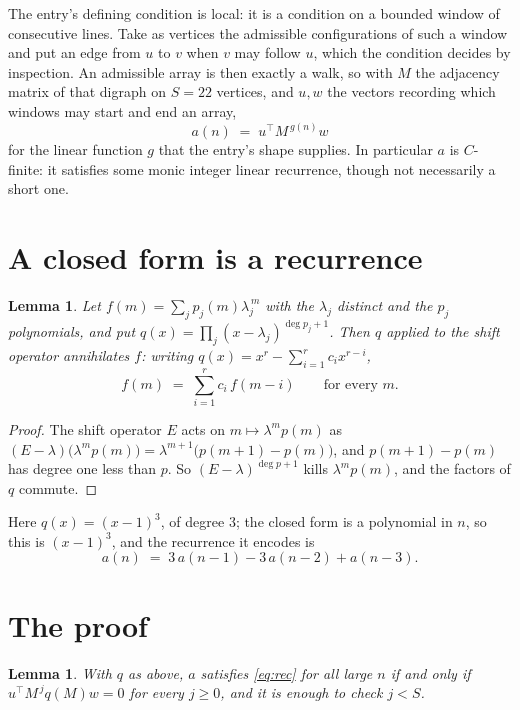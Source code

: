 \documentclass[11pt,a4paper]{article}
\theoremstyle{plain}
\newtheorem{lemma}[theorem]{Lemma}
\theoremstyle{definition}
\begin{document}
The entry's defining condition is local: it is a condition on a bounded window of consecutive lines. Take as vertices the
admissible configurations of such a window and put an edge from $u$ to $v$ when $v$ may
follow $u$, which the condition decides by inspection. An admissible array is then exactly a
walk, so with $M$ the adjacency matrix of that digraph on $S=22$ vertices, and $u,w$ the
vectors recording which windows may start and end an array,
\[
a(n)\;=\;u^{\!\top}M^{\,g(n)}w
\]
for the linear function $g$ that the entry's shape supplies. In particular $a$ is
$C$-finite: it satisfies some monic integer linear recurrence, though not necessarily a short
one.

\section{A closed form is a recurrence}

\begin{lemma}\label{lem:ann}
Let $f(m)=\sum_{j}p_j(m)\lambda_j^{\,m}$ with the $\lambda_j$ distinct and the $p_j$
polynomials, and put $q(x)=\prod_j(x-\lambda_j)^{\deg p_j+1}$. Then $q$ applied to the shift
operator annihilates $f$: writing $q(x)=x^{r}-\sum_{i=1}^{r}c_ix^{r-i}$,
\[
f(m)\;=\;\sum_{i=1}^{r}c_i\,f(m-i)\qquad\text{for every }m.
\]
\end{lemma}

\begin{proof}
The shift operator $E$ acts on $m\mapsto\lambda^{m}p(m)$ as
$(E-\lambda)\bigl(\lambda^{m}p(m)\bigr)=\lambda^{m+1}\bigl(p(m+1)-p(m)\bigr)$, and
$p(m+1)-p(m)$ has degree one less than $p$. So $(E-\lambda)^{\deg p+1}$ kills
$\lambda^{m}p(m)$, and the factors of $q$ commute.
\end{proof}

Here $q(x)=(x-1)^{3}$, of degree $3$; the closed form is a polynomial in $n$, so this is $(x-1)^{3}$, and the recurrence it encodes is
\begin{equation}\label{eq:rec}
a(n)\;=\;3\,a(n-1) - 3\,a(n-2) + a(n-3).
\end{equation}

\section{The proof}

\begin{lemma}\label{lem:crit}
With $q$ as above, $a$ satisfies \eqref{eq:rec} for all large $n$ if and only if
$u^{\!\top}M^{\,j}q(M)w=0$ for every $j\ge0$, and it is enough to check $j<S$.
\end{lemma}
\end{document}
